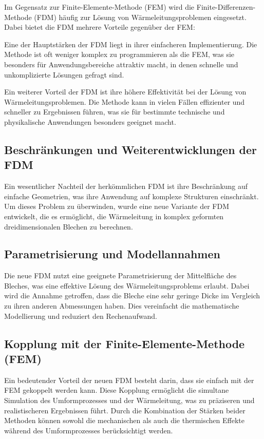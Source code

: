 Im Gegensatz zur Finite-Elemente-Methode (FEM) wird die Finite-Differenzen-Methode (FDM) häufig zur Lösung von Wärmeleitungsproblemen eingesetzt. Dabei bietet die FDM mehrere Vorteile gegenüber der FEM:

Eine der Hauptstärken der FDM liegt in ihrer einfacheren Implementierung. Die Methode ist oft weniger komplex zu programmieren als die FEM, was sie besonders für Anwendungsbereiche attraktiv macht, in denen schnelle und unkomplizierte Lösungen gefragt sind.

Ein weiterer Vorteil der FDM ist ihre höhere Effektivität bei der Lösung von Wärmeleitungsproblemen. Die Methode kann in vielen Fällen effizienter und schneller zu Ergebnissen führen, was sie für bestimmte technische und physikalische Anwendungen besonders geeignet macht.


\subsection{Beschränkungen und Weiterentwicklungen der FDM}

Ein wesentlicher Nachteil der herkömmlichen FDM ist ihre Beschränkung auf einfache Geometrien, was ihre Anwendung auf komplexe Strukturen einschränkt. Um dieses Problem zu überwinden, wurde eine neue Variante der FDM entwickelt, die es ermöglicht, die Wärmeleitung in komplex geformten dreidimensionalen Blechen zu berechnen.

\subsection{Parametrisierung und Modellannahmen}

Die neue FDM nutzt eine geeignete Parametrisierung der Mittelfläche des Bleches, was eine effektive Lösung des Wärmeleitungsproblems erlaubt. Dabei wird die Annahme getroffen, dass die Bleche eine sehr geringe Dicke im Vergleich zu ihren anderen Abmessungen haben. Dies vereinfacht die mathematische Modellierung und reduziert den Rechenaufwand.

\subsection{Kopplung mit der Finite-Elemente-Methode (FEM)}

Ein bedeutender Vorteil der neuen FDM besteht darin, dass sie einfach mit der FEM gekoppelt werden kann. Diese Kopplung ermöglicht die simultane Simulation des Umformprozesses und der Wärmeleitung, was zu präziseren und realistischeren Ergebnissen führt. Durch die Kombination der Stärken beider Methoden können sowohl die mechanischen als auch die thermischen Effekte während des Umformprozesses berücksichtigt werden.


